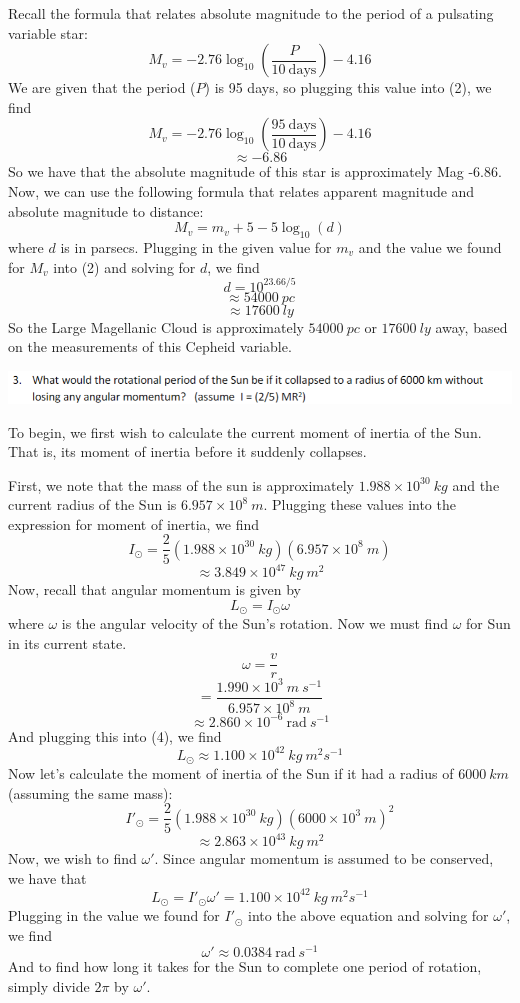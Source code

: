 \documentclass{article}
\begin{document}
Recall the formula that relates absolute magnitude to the period of a pulsating variable star:
\begin{equation}
    M_v = -2.76\log_{10}{\left(\frac{P}{10 \:\text{days}}\right)} - 4.16
\end{equation}
We are given that the period ($P$) is 95 days, so plugging this value into (2), we find
\[M_v = -2.76 \log_{10}{\left(\frac{95 \:\text{days}}{10 \:\text{days}}\right)} - 4.16\]
\[\approx -6.86\]
So we have that the absolute magnitude of this star is approximately Mag -6.86. Now, we can use the following formula that relates apparent magnitude and absolute magnitude to distance:
\begin{equation}
    M_v = m_v + 5 - 5\log_{10}{(d)}
\end{equation}
where $d$ is in parsecs. Plugging in the given value for $m_v$ and the value we found for $M_v$ into (2) and solving for $d$, we find
\[d = 10^{23.66/5}\]
\[\approx 54000 \: pc\]
\[\approx 17600 \: ly\]
So the Large Magellanic Cloud is approximately $54000 \: pc$ or $17600 \:ly$ away, based on the measurements of this Cepheid variable.
\newline

\includegraphics[scale = 0.8]{problemset9prob3.PNG}
\newline

To begin, we first wish to calculate the current moment of inertia of the Sun. That is, its moment of inertia before it suddenly collapses.

First, we note that the mass of the sun is approximately $1.988 \times 10^{30} \: kg$ and the current radius of the Sun is $6.957 \times 10^8 \:m$. Plugging these values into the expression for moment of inertia, we find
\[I_{\odot} = \frac{2}{5}(1.988 \times 10^{30} \:kg)(6.957 \times 10^8 \:m)\]
\[\approx 3.849 \times 10^{47} \:kg\: m^2\]
Now, recall that angular momentum is given by
\begin{equation}
    L_{\odot} = I_{\odot} \omega
\end{equation}
where $\omega$ is the angular velocity of the Sun's rotation. Now we must find $\omega$ for Sun in its current state.
\[\omega = \frac{v}{r}\]
\[= \frac{1.990 \times 10^3 \:m\:s^{-1}}{6.957 \times 10^8 \:m}\]
\[\approx 2.860 \times 10^{-6} \:\text{rad} \: s^{-1}\]
And plugging this into (4), we find
\[L_{\odot} \approx 1.100 \times 10^{42} \:kg\:m^2 s^{-1}\]
Now let's calculate the moment of inertia of the Sun if it had a radius of $6000 \:km$ (assuming the same mass):
\[I'_{\odot} = \frac{2}{5} (1.988 \times 10^{30} \:kg)(6000 \times 10^3 \:m)^2\]
\[\approx 2.863 \times 10^{43} \:kg\:m^2\]
Now, we wish to find $\omega '$. Since angular momentum is assumed to be conserved, we have that
\[L_{\odot} = I'_{\odot} \omega ' = 1.100 \times 10^{42} \:kg\:m^2 s^{-1}\]
Plugging in the value we found for $I'_{\odot}$ into the above equation and solving for $\omega '$, we find
\[\omega ' \approx 0.0384 \:\text{rad}\:s^{-1}\]
And to find how long it takes for the Sun to complete one period of rotation, simply divide $2\pi$ by $\omega '$.
\end{document}
